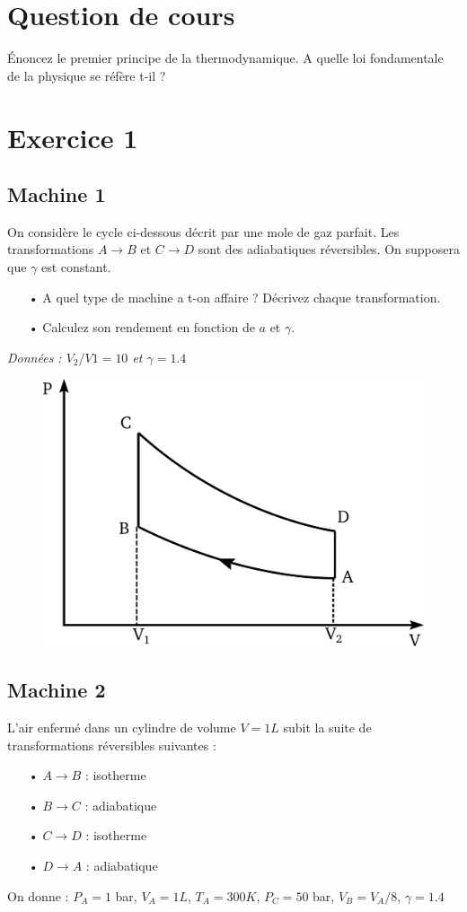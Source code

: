 \documentclass{report}
\begin{document}
\section*{Question de cours}
Énoncez le premier principe de la thermodynamique. A quelle loi fondamentale de la physique se réfère t-il ?

\section*{Exercice 1}

\subsection*{Machine 1}

On considère le cycle ci-dessous décrit par une mole de gaz parfait. Les transformations $A\rightarrow B$ et $C\rightarrow D$ sont des adiabatiques réversibles. On supposera que $\gamma$ est constant.

\begin{itemize}
	\item[•] A quel type de machine a t-on affaire ? Décrivez chaque transformation.
	\item[•] Calculez son rendement en fonction de $a$ et $\gamma$.
\end{itemize}

\textit{Données : $ V_{2}/V{1} = 10$ et $ \gamma=1.4$}

\begin{figure}[!h]
\centering
\includegraphics[width=0.3\linewidth]{cycle_beau_rochas.pdf}
\end{figure}

\subsection*{Machine 2}

L'air enfermé dans un cylindre de volume $V=1L$ subit la suite de transformations réversibles suivantes :
\begin{itemize}
\item[•]$A \rightarrow B$ : isotherme
\item[•]$B \rightarrow C$ : adiabatique
\item[•]$C \rightarrow D$ : isotherme
\item[•]$D \rightarrow A$ : adiabatique

\end{itemize}
On donne : $P_{A}=1$ bar, $V_{A} = 1L$, $T_{A}=300K$, $ P_{C}=50$ bar, $V_{B} = V_{A}/8$, $\gamma=1.4$
\end{document}
